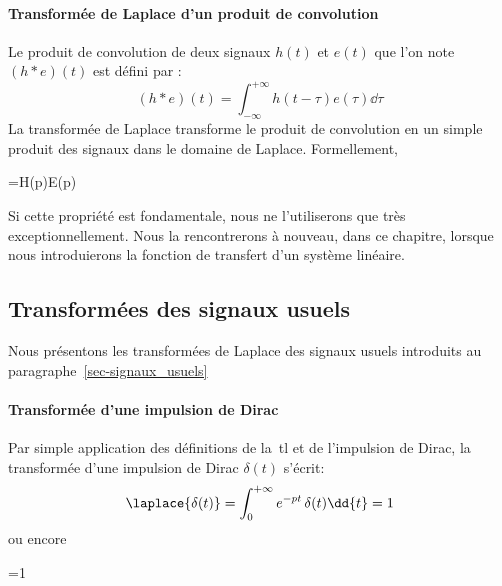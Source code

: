 \paragraph{Transformée de Laplace d'un produit de convolution}
Le produit de convolution de deux signaux $h(t)$ et $e(t)$ que l'on 
note $(h*e)(t)$ est défini par :
$$
(h*e)(t)=\int_{-\infty}^{+\infty}h(t-\tau)e(\tau)\dd{\tau}
$$
La transformée de Laplace transforme le produit de convolution en un simple
produit des signaux dans le domaine de Laplace. Formellement,
\begin{bequation}
    =H(p)E(p)
\end{bequation}
Si cette propriété est fondamentale, nous ne l'utiliserons 
que très exceptionnellement. Nous la rencontrerons à nouveau, 
dans ce chapitre, lorsque nous introduierons la fonction de 
transfert d'un système linéaire.

\subsection{Transformées des signaux usuels}
Nous présentons les transformées de Laplace des signaux usuels introduits
au paragraphe~\ref{sec-signaux_usuels}

\paragraph{Transformée d'une impulsion de Dirac}
Par simple application des définitions 
de la~\gls{tl} et de l'impulsion de Dirac, la transformée d'une 
impulsion de Dirac $\delta(t)$ s'écrit:
$$
\laplace{\delta(t)}=\int_{0}^{+\infty} e^{-pt}\,\delta(t)\dd{t}=1
$$
ou encore
\begin{bequation}
    =1
\end{bequation}

